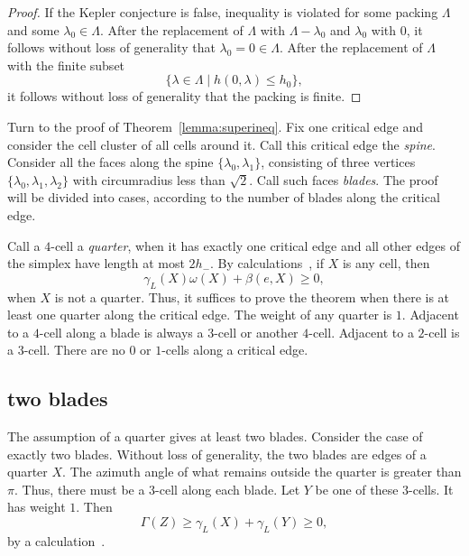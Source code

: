 \begin{proof} If the Kepler conjecture is false, inequality  is violated for some packing $\Lambda$ and some $\lambda_0\in\Lambda$.  After the replacement of $\Lambda$ with $\Lambda - \lambda_0$ and $\lambda_0$ with $0$, it follows without loss of generality that $\lambda_0=0\in\Lambda$.  After the replacement of $\Lambda$ with the finite subset
$$
\{\lambda\in\Lambda\mid h(0,\lambda)\le h_0\},
$$
it follows without loss of generality that the packing is finite.
\end{proof}


Turn to the proof of Theorem~\ref{lemma:superineq}. Fix one critical edge and consider the cell cluster of all cells around it.  Call this critical edge the {\it spine}.  Consider all the faces along the spine $\{\lambda_0,\lambda_1\}$, consisting of three vertices $\{\lambda_0,\lambda_1,\lambda_2\}$ with circumradius less than $\sqrt2$.  Call such faces {\it blades}.  The proof will be divided into cases, according to the number of blades along the critical edge.

Call a $4$-cell a {\it quarter}, when it has exactly one critical edge and all other edges of the simplex have length at most $2 h_-$. By calculations~\cite[cc:qtr:GLFVCVK]{hales:2009:nonlinear}, if $X$ is any cell, then %
$$
 \gamma_L(X) \omega(X) + \beta(e,X)\ge 0,
$$ 
when $X$ is not a quarter.  Thus, it
suffices to prove the theorem
when there is at least one quarter along the critical
edge.  The weight of any quarter is $1$.
Adjacent to a $4$-cell along a blade is always a $3$-cell or another $4$-cell. Adjacent to a $2$-cell is a $3$-cell.  There are no $0$ or $1$-cells along a critical edge.


\subsection{two blades}

The assumption of a quarter gives at least two blades.  Consider
the case of exactly two blades.
Without loss of generality, the two blades are edges of a quarter
$X$. 
The azimuth angle of what remains outside the quarter
is greater than $\pi$.  Thus, there must be a $3$-cell
along each blade.  Let $Y$ be one of these $3$-cells.
It has weight $1$.
Then 
\begin{equation}\label{eqn:34}
\Gamma(Z)\ge \gamma_L(X)+\gamma_L(Y)\ge 0,
\end{equation}
by a calculation~\cite[cc:2bl:FHBVYXZ]{hales:2009:nonlinear}. %




